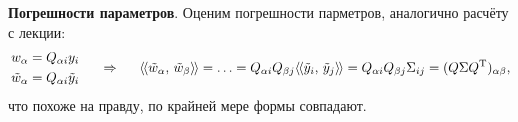 \textbf{Погрешности параметров}. Оценим погрешности парметров, аналогично расчёту с лекции:
\begin{equation*}
    \left.\begin{aligned}
        w_\alpha = Q_{\alpha i} y_i \\
        \tilde{w}_\alpha = Q_{\alpha i} \tilde{y}_i
    \end{aligned}\right.
    \hspace{0.5cm} \Rightarrow \hspace{0.5cm}
    \langle\hspace{-1.2pt}\langle \tilde{w}_\alpha,\, \tilde{w}_\beta \rangle\hspace{-1.2pt}\rangle = \ldots = Q_{\alpha i} Q_{\beta j} \langle\hspace{-1.2pt}\langle \tilde{y}_i,\, \tilde{y}_j \rangle\hspace{-1.2pt}\rangle = Q_{\alpha i} Q_{\beta j} \Sigma_{ij} = (Q \Sigma Q^{\text{T}})_{\alpha \beta},
\end{equation*}
что похоже на правду, по крайней мере формы совпадают. 


